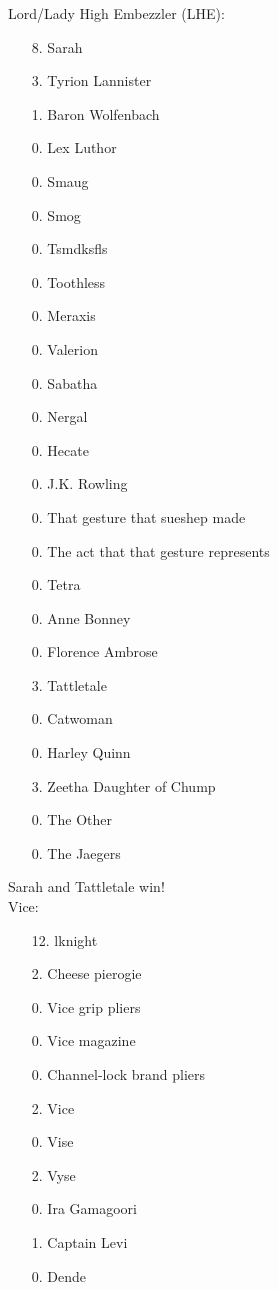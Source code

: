 \documentclass[10pt]{article}
\begin{document}
Lord/Lady High Embezzler (LHE): \\
\begin{itemize}
  \item[8.] Sarah
  \item[3.] Tyrion Lannister
  \item[1.] Baron Wolfenbach
  \item[0.] Lex Luthor
  \item[0.] Smaug
  \item[0.] Smog
  \item[0.] Tsmdksfls
  \item[0.] Toothless
  \item[0.] Meraxis
  \item[0.] Valerion
  \item[0.] Sabatha
  \item[0.] Nergal
  \item[0.] Hecate
  \item[0.] J.K. Rowling
  \item[0.] That gesture that sueshep made
  \item[0.] The act that that gesture represents
  \item[0.] Tetra
  \item[0.] Anne Bonney
  \item[0.] Florence Ambrose
  \item[3.] Tattletale
  \item[0.] Catwoman
  \item[0.] Harley Quinn
  \item[3.] Zeetha Daughter of Chump
  \item[0.] The Other
  \item[0.] The Jaegers
\end{itemize}

Sarah and Tattletale win! \\

Vice: \\
\begin{itemize}
  \item[12.] lknight
  \item[2.] Cheese pierogie
  \item[0.] Vice grip pliers
  \item[0.] Vice magazine
  \item[0.] Channel-lock brand pliers
  \item[2.] Vice
  \item[0.] Vise
  \item[2.] Vyse
  \item[0.] Ira Gamagoori
  \item[1.] Captain Levi
  \item[0.] Dende
\end{itemize}
\end{document}
